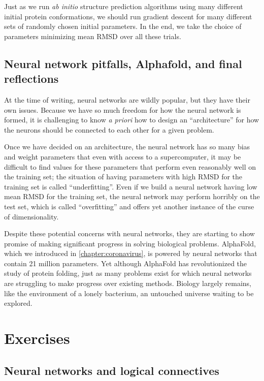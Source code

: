 Just as we run \textit{ab initio} structure prediction algorithms using many different initial protein conformations, we should run gradient descent for many different sets of randomly chosen initial parameters. In the end, we take the choice of parameters minimizing mean RMSD over all these trials.

\subsection{Neural network pitfalls, Alphafold, and final reflections}

At the time of writing, neural networks are wildly popular, but they have their own issues. Because we have so much freedom for how the neural network is formed, it is challenging to know \textit{a priori} how to design an ``architecture'' for how the neurons should be connected to each other for a given problem.

Once we have decided on an architecture, the neural network has so many bias and weight parameters that even with access to a supercomputer, it may be difficult to find values for these parameters that perform even reasonably well on the training set; the situation of having parameters with high RMSD for the training set is called ``underfitting''. Even if we build a neural network having low mean RMSD for the training set, the neural network may perform horribly on the test set, which is called ``overfitting'' and offers yet another instance of the curse of dimensionality.

Despite these potential concerns with neural networks, they are starting to show promise of making significant progress in solving biological problems. AlphaFold, which we introduced in \autoref{chapter:coronavirus}, is powered by neural networks that contain 21 million parameters.  Yet although AlphaFold has revolutionized the study of protein folding, just as many problems exist for which neural networks are struggling to make progress over existing methods. Biology largely remains, like the environment of a lonely bacterium, an untouched universe waiting to be explored.

\FloatBarrier

\newpage
{}
\section{Exercises}

\subsection{Neural networks and logical connectives}

